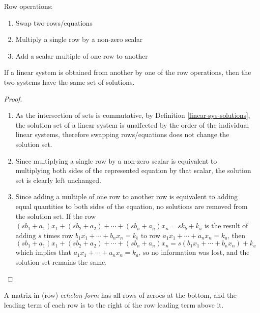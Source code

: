\begin{defn}\label{row-op}
    Row operations: \begin{enumerate}
        \item Swap two rows/equations
        \item Multiply a single row by a non-zero scalar
        \item Add a scalar multiple of one row to another
    \end{enumerate}
\end{defn}

\begin{thm}\label{solutions-unchanged-by-row-ops}
    If a linear system is obtained from another by one of the row operations, then the two systems have the same set of solutions.
\end{thm}

\begin{proof}\proofbreak
    \begin{enumerate}
        \item As the intersection of sets is commutative, by Definition \ref{linear-sys-solutions}, the solution set of a linear system is unaffected by the order of the individual linear systems, therefore swapping rows/equations does not change the solution set.
        \item Since multiplying a single row by a non-zero scalar is equivalent to multiplying both sides of the represented equation by that scalar, the solution set is clearly left unchanged.
        \item Since adding a multiple of one row to another row is equivalent to adding equal quantities to both sides of the equation, no solutions are removed from the solution set. If the row $(sb_1 + a_1)x_1 + (sb_2 + a_2) + \cdots + (sb_n + a_n)x_n = sk_b + k_a$ is the result of adding $s$ times row $b_1x_1 + \cdots + b_nx_n = k_b$ to row $a_1x_1 + \cdots + a_nx_n = k_a$, then $(sb_1 + a_1)x_1 + (sb_2 + a_2) + \cdots + (sb_n + a_n)x_n = s(b_1x_1 + \cdots + b_nx_n) + k_a$  which implies that $a_1x_1 + \cdots + a_nx_n = k_a$, so no information was lost, and the solution set remains the same.
    \end{enumerate}
\end{proof}

\begin{defn}
    A matrix in (row) \emph{echelon form} has all rows of zeroes at the bottom, and the leading term of each row is to the right of the row leading term above it.
\end{defn}

